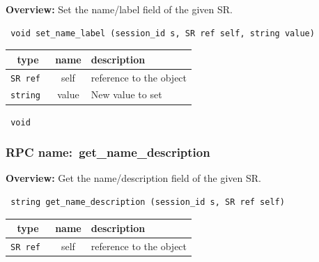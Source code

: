 {\bf Overview:} 
Set the name/label field of the given SR.

\begin{verbatim} void set_name_label (session_id s, SR ref self, string value)\end{verbatim}



 
\vspace{0.3cm}
\begin{tabular}{|c|c|p{7cm}|}
 \hline
{\bf type} & {\bf name} & {\bf description} \\ \hline
{\tt SR ref } & self & reference to the object \\ \hline 

{\tt string } & value & New value to set \\ \hline 

\end{tabular}

\vspace{0.3cm}

{\tt 
void
}



\vspace{0.3cm}
\vspace{0.3cm}
\vspace{0.3cm}
\subsubsection{RPC name:~get\_name\_description}

{\bf Overview:} 
Get the name/description field of the given SR.

\begin{verbatim} string get_name_description (session_id s, SR ref self)\end{verbatim}



 
\vspace{0.3cm}
\begin{tabular}{|c|c|p{7cm}|}
 \hline
{\bf type} & {\bf name} & {\bf description} \\ \hline
{\tt SR ref } & self & reference to the object \\ \hline 

\end{tabular}

\vspace{0.3cm}

